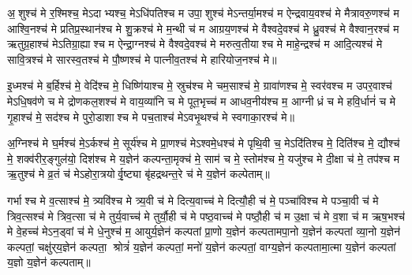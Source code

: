 

अ॒शुश्च॑ मे र॒श्मिश्च॒ मेऽदाभ्यश्च॒ मेऽधि॑पतिश्च म उपा॒शुश्च॑ मेऽन्तर्या॒मश्च॑ म ऐन्द्रवाय॒वश्च॑ मे मैत्रावरु॒णश्च॑ म आश्वि॒नश्च॑ मे प्रतिप्र॒स्थान॑श्च मे शु॒क्रश्च॑ मे म॒न्थी च॑ म आग्रय॒णश्च॑ मे वैश्वदे॒वश्च॑ मे ध्रु॒वश्च॑ मे वैश्वान॒रश्च॑ म ऋतुग्र॒हाश्च॑ मेऽतिग्रा॒ह्याश्च म ऐन्द्रा॒ग्नश्च॑ मे वैश्वदे॒वश्च॑ मे मरुत्व॒तीयाश्च मे माहे॒न्द्रश्च॑ म आदि॒त्यश्च॑ मे सावि॒त्रश्च॑ मे सारस्व॒तश्च॑ मे पौ॒ष्णश्च॑ मे पात्नीव॒तश्च॑ मे हारियोज॒नश्च॑ मे॥ 



इ॒ध्मश्च॑ मे ब॒र्हिश्च॑ मे॒ वेदि॑श्च मे॒ धिष्णि॑याश्च मे॒ स्रुच॑श्च मे चम॒साश्च॑ मे॒ ग्रावा॑णश्च मे॒ स्वर॑वश्च म उपर॒वाश्च॑ मेऽधि॒षव॑णे च मे द्रोणकल॒शश्च॑ मे वाय॒व्या॑नि च मे पूत॒भृच्च॑ म आधव॒नीय॑श्च म॒ आग्नीध्रं च मे हवि॒र्धानं॑ च मे गृ॒हाश्च॑ मे॒ सद॑श्च मे पुरो॒डाशाश्च मे पच॒ताश्च॑ मेऽवभृ॒थश्च॑ मे स्वगाका॒रश्च॑ मे॥ 



अ॒ग्निश्च॑ मे घ॒र्मश्च॑ मे॒ऽर्कश्च॑ मे॒ सूर्य॑श्च मे प्रा॒णश्च॑ मेऽश्वमे॒धश्च॑ मे पृथि॒वी च॒ मेऽदि॑तिश्च मे॒ दिति॑श्च मे॒ द्यौश्च॑ मे॒ शक्व॑रीर॒ङ्गुल॑यो॒ दिश॑श्च मे य॒ज्ञेन॑ कल्पन्ता॒मृक्च॑ मे॒ साम॑ च मे॒ स्तोम॑श्च मे॒ यजु॑श्च मे दी॒क्षा च॑ मे॒ तप॑श्च म ऋ॒तुश्च॑ मे व्र॒तं च॑ मेऽहोरा॒त्रयोर्वृ॒ष्ट्या बृ॑हद्रथन्त॒रे च॑ मे य॒ज्ञेन॑ कल्पेताम्॥ 



गर्भाश्च मे व॒त्साश्च॑ मे॒ त्र्यवि॑श्च मे त्र्य॒वी च॑ मे दित्य॒वाच्च॑ मे दित्यौ॒ही च॑ मे॒ पञ्चा॑विश्च मे पञ्चा॒वी च॑ मे त्रिव॒त्सश्च॑ मे त्रिव॒त्सा च॑ मे तुर्य॒वाच्च॑ मे तुर्यौ॒ही च॑ मे पष्ठ॒वाच्च॑ मे पष्ठौ॒ही च॑ म उ॒क्षा च॑ मे व॒शा च॑ म ऋष॒भश्च॑ मे वे॒हच्च॑ मेऽन॒ड्वां च॑ मे धे॒नुश्च॑ म॒ आयुर्य॒ज्ञेन॑ कल्पतां प्रा॒णो य॒ज्ञेन॑ कल्पतामपा॒नो य॒ज्ञेन॑ कल्पतां व्या॒नो य॒ज्ञेन॑ कल्पतां॒ चक्षु॑र्‌य॒ज्ञेन॑ कल्पता॒ श्रोत्रं॑ य॒ज्ञेन॑ कल्पतां॒ मनो॑ य॒ज्ञेन॑ कल्पतां॒ वाग्य॒ज्ञेन॑ कल्पतामा॒त्मा य॒ज्ञेन॑ कल्पतां य॒ज्ञो य॒ज्ञेन॑ कल्पताम्॥ 

